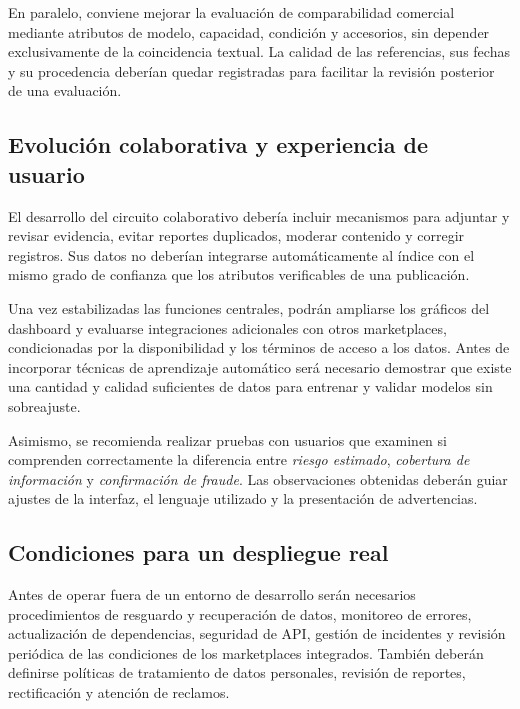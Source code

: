 En paralelo, conviene mejorar la evaluación de comparabilidad comercial mediante atributos de modelo, capacidad, condición y accesorios, sin depender exclusivamente de la coincidencia textual. La calidad de las referencias, sus fechas y su procedencia deberían quedar registradas para facilitar la revisión posterior de una evaluación.

\subsection{Evolución colaborativa y experiencia de usuario}\label{subsec:ml-recomendaciones-evolucion}

El desarrollo del circuito colaborativo debería incluir mecanismos para adjuntar y revisar evidencia, evitar reportes duplicados, moderar contenido y corregir registros. Sus datos no deberían integrarse automáticamente al índice con el mismo grado de confianza que los atributos verificables de una publicación.

Una vez estabilizadas las funciones centrales, podrán ampliarse los gráficos del dashboard y evaluarse integraciones adicionales con otros marketplaces, condicionadas por la disponibilidad y los términos de acceso a los datos. Antes de incorporar técnicas de aprendizaje automático será necesario demostrar que existe una cantidad y calidad suficientes de datos para entrenar y validar modelos sin sobreajuste.

Asimismo, se recomienda realizar pruebas con usuarios que examinen si comprenden correctamente la diferencia entre \textit{riesgo estimado}, \textit{cobertura de información} y \textit{confirmación de fraude}. Las observaciones obtenidas deberán guiar ajustes de la interfaz, el lenguaje utilizado y la presentación de advertencias.

\subsection{Condiciones para un despliegue real}\label{subsec:ml-recomendaciones-despliegue}

Antes de operar fuera de un entorno de desarrollo serán necesarios procedimientos de resguardo y recuperación de datos, monitoreo de errores, actualización de dependencias, seguridad de API, gestión de incidentes y revisión periódica de las condiciones de los marketplaces integrados. También deberán definirse políticas de tratamiento de datos personales, revisión de reportes, rectificación y atención de reclamos.

